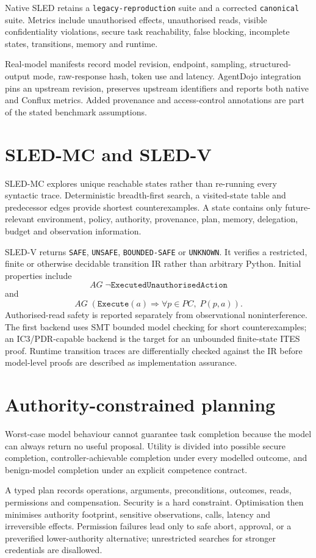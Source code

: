 \documentclass[11pt]{article}
\begin{document}
Native SLED retains a \texttt{legacy-reproduction} suite and a corrected \texttt{canonical} suite. Metrics include unauthorised effects, unauthorised reads, visible confidentiality violations, secure task reachability, false blocking, incomplete states, transitions, memory and runtime.

Real-model manifests record model revision, endpoint, sampling, structured-output mode, raw-response hash, token use and latency. AgentDojo integration pins an upstream revision, preserves upstream identifiers and reports both native and Conflux metrics. Added provenance and access-control annotations are part of the stated benchmark assumptions.

\section{SLED-MC and SLED-V}
SLED-MC explores unique reachable states rather than re-running every syntactic trace. Deterministic breadth-first search, a visited-state table and predecessor edges provide shortest counterexamples. A state contains only future-relevant environment, policy, authority, provenance, plan, memory, delegation, budget and observation information.

SLED-V returns \texttt{SAFE}, \texttt{UNSAFE}, \texttt{BOUNDED-SAFE} or \texttt{UNKNOWN}. It verifies a restricted, finite or otherwise decidable transition IR rather than arbitrary Python. Initial properties include
\[
AG\;\neg\texttt{ExecutedUnauthorisedAction}
\]
and
\[
AG\;(\texttt{Execute}(a) \Rightarrow \forall p\in PC,\;P(p,a)).
\]
Authorised-read safety is reported separately from observational noninterference. The first backend uses SMT bounded model checking for short counterexamples; an IC3/PDR-capable backend is the target for an unbounded finite-state ITES proof. Runtime transition traces are differentially checked against the IR before model-level proofs are described as implementation assurance.

\section{Authority-constrained planning}
Worst-case model behaviour cannot guarantee task completion because the model can always return no useful proposal. Utility is divided into possible secure completion, controller-achievable completion under every modelled outcome, and benign-model completion under an explicit competence contract.

A typed plan records operations, arguments, preconditions, outcomes, reads, permissions and compensation. Security is a hard constraint. Optimisation then minimises authority footprint, sensitive observations, calls, latency and irreversible effects. Permission failures lead only to safe abort, approval, or a preverified lower-authority alternative; unrestricted searches for stronger credentials are disallowed.
\end{document}

